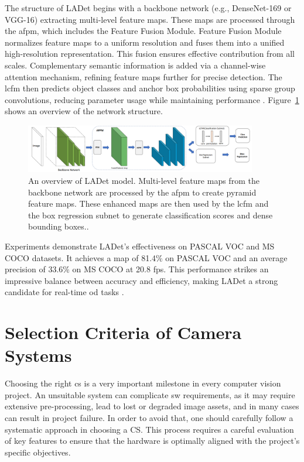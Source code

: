 \begin{enumerate}
     The structure of LADet begins with a backbone network (e.g., DenseNet-169 or VGG-16) extracting multi-level feature maps. These maps are processed through the \gls{afpm}, which includes the Feature Fusion Module. Feature Fusion Module normalizes feature maps to a uniform resolution and fuses them into a unified high-resolution representation. This fusion ensures effective contribution from all scales. Complementary semantic information is added via a channel-wise attention mechanism, refining feature maps further for precise detection. The \gls{lcfm} then predicts object classes and anchor box probabilities using sparse group convolutions, reducing parameter usage while maintaining performance \cite{LADet}. Figure~\ref{LADet} shows an overview of the network structure.

     \begin{figure}[ht]
        \centering
        \includegraphics[width=0.9\textwidth]{Figures/LADet.PNG} 
        \caption{An overview of LADet model. Multi-level feature maps from the backbone network are processed by the \gls{afpm} to create pyramid feature maps. These enhanced maps are then used by the \gls{lcfm} and the box regression subnet to generate classification scores and dense bounding boxes.\cite{LADet}.}
        \label{LADet}
    \end{figure}

     Experiments demonstrate LADet's effectiveness on PASCAL VOC and MS COCO datasets. It achieves a \gls{map} of 81.4\% on PASCAL VOC and an average precision of 33.6\% on MS COCO at 20.8 \gls{fps}. This performance strikes an impressive balance between accuracy and efficiency, making LADet a strong candidate for real-time \gls{od} tasks \cite{LADet}.
     
\end{enumerate}

\section{Selection Criteria of Camera Systems}
Choosing the right \gls{cs} is a very important milestone in every computer vision project. An unsuitable system can complicate \gls{sw} requirements, as it may require extensive pre-processing, lead to lost or degraded image assets, and in many cases can result in project failure. In order to avoid that, one should carefully follow a systematic approach in choosing a CS. This process requires a careful evaluation of key features to ensure that the hardware is optimally aligned with the project’s specific objectives.

